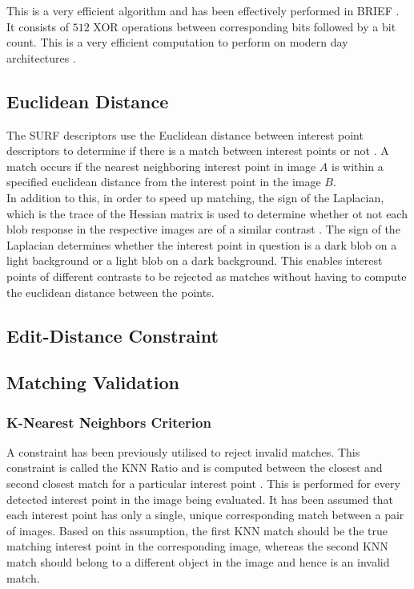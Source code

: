 \documentclass{article}
\begin{document}
This is a very efficient algorithm and has been effectively performed in BRIEF \cite{Calonder}. It consists of $512$ XOR operations between corresponding bits followed by a bit count. This is a very efficient computation to perform on modern day architectures \cite{Leutenegger2011}. \\ 

\subsection{Euclidean Distance}
\label{sec:euclidean}
The SURF descriptors use the Euclidean distance between interest point descriptors to determine if there is a match between interest points or not \cite{Lowe2004}. A match occurs if the nearest neighboring interest point in image $A$ is within a specified euclidean distance from the interest point in the image $B$.\\

In addition to this, in order to speed up matching, the sign of the Laplacian, which is the trace of the Hessian matrix is used to determine whether ot not each blob response in the respective images are of a similar contrast \cite{Bay2008}. The sign of the Laplacian determines whether the interest point in question is a dark blob on a light background or a light blob on a dark background. This enables interest points of different contrasts to be rejected as matches without having to compute the euclidean distance between the points.\\


\subsection{Edit-Distance Constraint}
\label{sec:editDistance}


\subsection{Matching Validation}
\label{sec:validation}

\subsubsection{K-Nearest Neighbors Criterion}
\label{sec:knnMatching}
A constraint has been previously utilised to reject invalid matches. This constraint is called the KNN Ratio and is computed between the closest and second closest match for a particular interest point \cite{Lowe2004}. This is performed for every detected interest point in the image being evaluated. It has been assumed that each interest point has only a single, unique corresponding match between a pair of images. Based on this assumption, the first KNN match should be the true matching interest point in the corresponding image, whereas the second KNN match should belong to a different object in the image and hence is an invalid match.\\
\end{document}
